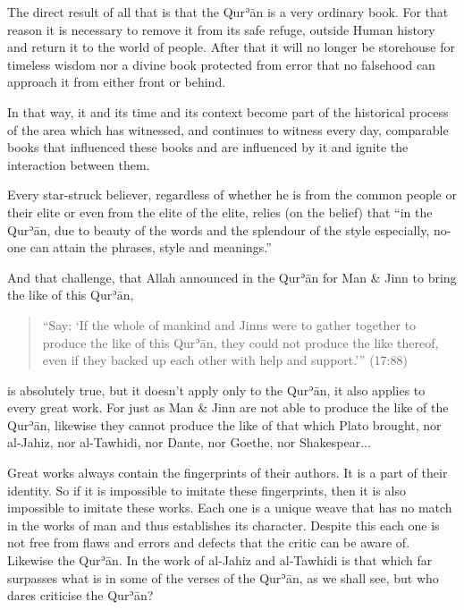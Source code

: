 \documentclass[12pt]{book}
\def \Quran{Qurʾān} %
\def \Qrn{\Quran}   %
\begin{document}
The direct result of all that is that the \Qrn{} is a very ordinary book. For
that reason it is necessary to remove it from its safe refuge, outside Human
history and return it to the world of people. After that it will no longer be
storehouse for timeless wisdom nor a divine book protected from error that no
falsehood can approach it from either front or behind.

In that way, it and its time and its context become part of the historical
process of the area which has witnessed, and continues to witness every day,
comparable books that influenced these books and are influenced by it and
ignite the interaction between them.

Every star-struck believer, regardless of whether he is from the common people
or their elite or even from the elite of the elite, relies (on the belief) that
“in the \Quran, due to beauty of the words and the splendour of the style
especially, no-one can attain the phrases, style and meanings.”\footnotemark


And that challenge, that Allah announced in the \Qrn{} for Man \& Jinn to bring
the like of this \Quran,

\begin{quote}
“Say: ‘If the whole of mankind and Jinns were to gather together to produce the
like of this \Quran, they could not produce the like thereof, even if they
backed up each other with help and support.’” (17:88)
\end{quote}

is absolutely true, but it doesn’t apply only to the \Quran, it also applies to
every great work. For just as Man \& Jinn are not able to produce the like of
the \Quran, likewise they cannot produce the like of that which Plato brought,
nor al-Jahiz, nor al-Tawhidi, nor Dante, nor Goethe, nor Shakespear...

Great works always contain the fingerprints of their authors. It is a part of
their identity. So if it is impossible to imitate these fingerprints, then it
is also impossible to imitate these works. Each one is a unique weave that has
no match in the works of man and thus establishes its character. Despite this
each one is not free from flaws and errors and defects that the critic can be
aware of. Likewise the \Quran. In the work of al-Jahiz and al-Tawhidi is that
which far surpasses what is in some of the verses of the \Quran, as we shall
see, but who dares criticise the \Quran?
\end{document}
